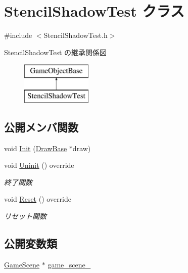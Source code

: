 \hypertarget{class_stencil_shadow_test}{}\section{Stencil\+Shadow\+Test クラス}
\label{class_stencil_shadow_test}


{\ttfamily \#include $<$Stencil\+Shadow\+Test.\+h$>$}

Stencil\+Shadow\+Test の継承関係図\begin{figure}[H]
\begin{center}
\leavevmode
\includegraphics[height=2.000000cm]{class_stencil_shadow_test}
\end{center}
\end{figure}
\subsection*{公開メンバ関数}
\begin{DoxyCompactItemize}
\item 
void \mbox{\hyperlink{class_stencil_shadow_test_a4a58695fafd134d750eb23ee5ec2bdb6}{Init}} (\mbox{\hyperlink{class_draw_base}{Draw\+Base}} $\ast$draw)
\item 
void \mbox{\hyperlink{class_stencil_shadow_test_a51b5d75aaba5673a13f950bd6b742720}{Uninit}} () override
\begin{DoxyCompactList}\small\item\em 終了関数 \end{DoxyCompactList}\item 
void \mbox{\hyperlink{class_stencil_shadow_test_a7691120143c64b99d6c8f5391be56e83}{Reset}} () override
\begin{DoxyCompactList}\small\item\em リセット関数 \end{DoxyCompactList}\end{DoxyCompactItemize}
\subsection*{公開変数類}
\begin{DoxyCompactItemize}
\item 
\mbox{\hyperlink{class_game_scene}{Game\+Scene}} $\ast$ \mbox{\hyperlink{class_stencil_shadow_test_ac108faf317516a8335f73ca8005fbb20}{game\+\_\+scene\+\_\+}}
\end{DoxyCompactItemize}
